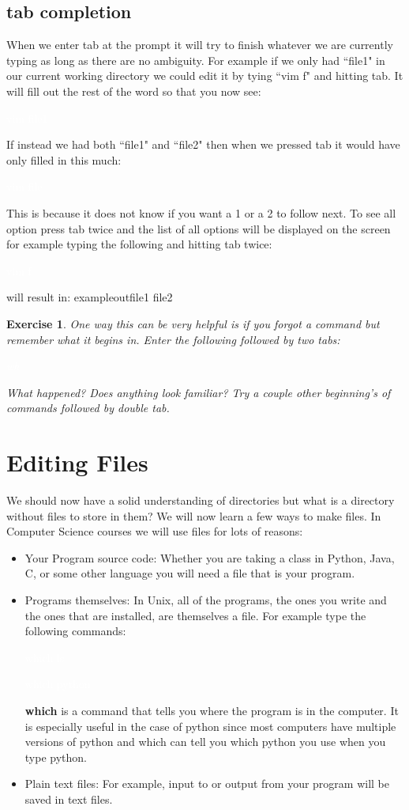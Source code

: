 \documentclass[oneside]{book}
\newcommand{\commandline}[1]{\begin{center} \colorbox{Dark}{\textcolor{white}{#1}} \end{center}}
\newtheorem{ex}{Exercise}[chapter]
\begin{document}
\subsection{tab completion}
When we enter tab at the prompt it will try to finish whatever we are currently typing as long as there are no ambiguity. For example if we only had ``file1" in our current working directory we could edit it by tying ``vim f" and hitting tab. It will fill out the rest of the word so that you now see:
\commandline{vim file1}
If instead we had both ``file1" and ``file2" then when we pressed tab it would have only filled in this much:
\commandline{vim file}
This is because it does not know if you want a 1 or a 2 to follow next. To see all option press tab twice and the list of all options will be displayed on the screen for example typing the following and hitting tab twice:
\commandline{vim f}
will result in:
exampleout{file1 file2}
\begin{ex}
One way this can be very helpful is if you forgot a command but remember what it begins in. Enter the following followed by two tabs:
\commandline{wh}
What happened? Does anything look familiar? Try a couple other beginning's of commands followed by double tab.
\end{ex}

\section{Editing Files}
We should now have a solid understanding of directories but what is a directory without files to store in them? We will now learn a few ways to make files. In Computer Science courses we will use files for lots of reasons:
\begin{itemize}
	\item Your Program source code: Whether you are taking a class in Python, Java, C, or some other language you will need a file that is your program.
	\item Programs themselves: In Unix, all of the programs, the ones you write and the ones that are installed, are themselves a file. For example type the following commands:
		\commandline{which ls}
		\commandline{which python}
	\textbf{which} is a command that tells you where the program is in the computer. It is especially useful in the case of python since most computers have multiple versions of python and which can tell you which python you use when you type python.
	\item Plain text files: For example, input to or output from your program will be saved in text files. 
\end{itemize}
\end{document}
